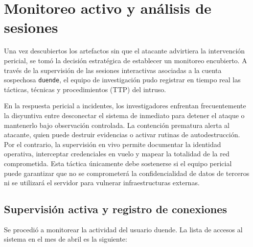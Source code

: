 \chapter{Monitoreo activo y análisis de sesiones}

Una vez descubiertos los artefactos sin que el atacante advirtiera la intervención pericial, se tomó la decisión estratégica de establecer un monitoreo encubierto. A través de la supervisión de las sesiones interactivas asociadas a la cuenta sospechosa \texttt{duende}, el equipo de investigación pudo registrar en tiempo real las tácticas, técnicas y procedimientos (TTP) del intruso.

\begin{notaforense}
En la respuesta pericial a incidentes, los investigadores enfrentan frecuentemente la disyuntiva entre desconectar el sistema de inmediato para detener el ataque o mantenerlo bajo observación controlada. La contención prematura alerta al atacante, quien puede destruir evidencias o activar rutinas de autodestrucción. Por el contrario, la supervisión en vivo permite documentar la identidad operativa, interceptar credenciales en vuelo y mapear la totalidad de la red comprometida. Esta táctica únicamente debe sostenerse si el equipo pericial puede garantizar que no se comprometerá la confidencialidad de datos de terceros ni se utilizará el servidor para vulnerar infraestructuras externas.
\end{notaforense}

\section{Supervisión activa y registro de conexiones}

Se procedió a monitorear la actividad del usuario duende. La lista de
accesos al sistema en el mes de abril es la siguiente:

\vspace{1em}

